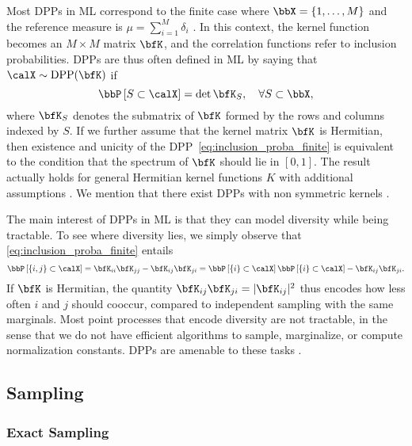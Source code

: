 \documentclass[twoside,11pt]{article}
\begin{document}
		\noindent
		Most DPPs in ML correspond to the finite case where $\bbX = \lrcb{1,\dots,M}$ and the reference measure is $\mu=\sum_{i=1}^M \delta_i$ \citep{KuTa12}.
		In this context, the kernel function becomes an $M\times M$ matrix $\bfK$, and the correlation functions refer to inclusion probabilities. DPPs are thus often defined in ML by saying that $\calX\sim \DPP(\bfK)$ if
	  \begin{equation}
	  \label{eq:inclusion_proba_finite}
	    \Proba{S \subset \calX} = \det {\bfK}_S,
	      \quad\forall S\subset \bbX,
	  \end{equation}
		\noindent
    where ${\bfK}_S$ denotes the submatrix of $\bfK$ formed by the rows and columns indexed by $S$. If we further assume that the kernel matrix $\bfK$ is Hermitian, then existence and unicity of the DPP~\eqref{eq:inclusion_proba_finite} is equivalent to the condition that the spectrum of $\bfK$ should lie in $[0,1]$.
    The result actually holds for general Hermitian kernel functions $K$ with additional assumptions \cite[Theorem 3]{Sos00}. We mention that there exist DPPs with non symmetric kernels \citep{BoDiFu10}.

    The main interest of DPPs in ML is that they can model diversity while being tractable.
    To see where diversity lies, we simply observe that \eqref{eq:inclusion_proba_finite} entails
    $$ \Proba{\{i,j\} \subset \calX} = {\bfK}_{ii}{\bfK}_{jj}-{\bfK}_{ij}{\bfK}_{ji} = \Proba{\{i\} \subset \calX}\Proba{\{i\} \subset \calX} - {\bfK}_{ij}{\bfK}_{ji}.$$
    If $\bfK$ is Hermitian, the quantity ${\bfK}_{ij}{\bfK}_{ji} = \vert{\bfK}_{ij}\vert^2$ thus encodes how less often $i$ and $j$ should cooccur, compared to independent sampling with the same marginals.
    Most point processes that encode diversity are not tractable, in the sense that we do not have efficient algorithms to sample, marginalize, or compute normalization constants.
    DPPs are amenable to these tasks \citep{KuTa12}.

  \subsection{Sampling} %
  \label{sub:sampling}

    \subsubsection{Exact Sampling} %
    \label{ssub:exact_sampling}
\end{document}

